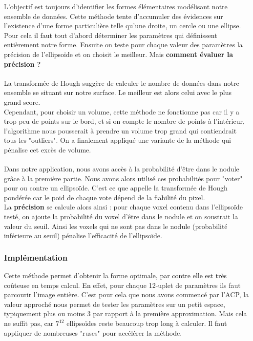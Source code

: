 \documentclass{article}
\begin{document}
L'objectif est toujours d'identifier les formes élémentaires modélisant notre ensemble de données. Cette méthode tente d'accumuler des évidences sur l'existence d'une forme particulière telle qu'une droite, un cercle ou  une ellipse. Pour cela il faut tout d'abord déterminer les paramètres qui définissent entièrement notre forme. Ensuite on teste pour chaque valeur des paramètres la précision de l'ellipsoïde et on choisit le meilleur. Mais \textbf{ comment évaluer la précision ?}\\\\
La transformée de Hough suggère de calculer le nombre de données dans notre ensemble se situant sur notre surface. Le meilleur est alors celui avec le plus grand score.\\
Cependant, pour choisir un volume, cette méthode ne fonctionne pas car il y a trop peu de points sur le bord, et si on compte le nombre de points à l'intérieur, l'algorithme nous pousserait à prendre un volume trop grand qui contiendrait tous les "outliers". On a finalement appliqué une variante de la méthode qui pénalise cet excès de volume.\\\\
Dans notre application, nous avons accès à la probabilité d'être dans le nodule grâce à la première partie. Nous avons alors utilisé ces probabilités pour "voter" pour ou contre un ellipsoïde. C'est ce que \cite{bib:HoughPondere} appelle la transformée de Hough pondérée car le poid de chaque vote dépend de la fiabilité du pixel.\\
La \textbf{précision} se calcule alors ainsi : pour chaque voxel contenu dans l'ellipsoïde testé, on ajoute la probabilité du voxel d'être dans le nodule et on soustrait la valeur du seuil. Ainsi les voxels qui ne sont pas dans le nodule (probabilité inférieure au seuil) pénalise l'efficacité de l'ellipsoïde.

\subsubsection{Implémentation}

Cette méthode permet d'obtenir la forme optimale, par contre elle est très coûteuse en temps calcul. En effet, pour chaque 12-uplet de paramètres ils faut parcourir l'image entière. C'est pour cela que nous avons commencé par l'ACP, la valeur approché nous permet de tester les paramètres sur un petit espace, typiquement plus ou moins 3 par rapport à la première approximation. Mais cela ne suffit pas, car $7^{12}$ ellipsoïdes reste beaucoup trop long à calculer. Il faut appliquer de nombreuses "ruses" pour accélérer la méthode.
\end{document}
